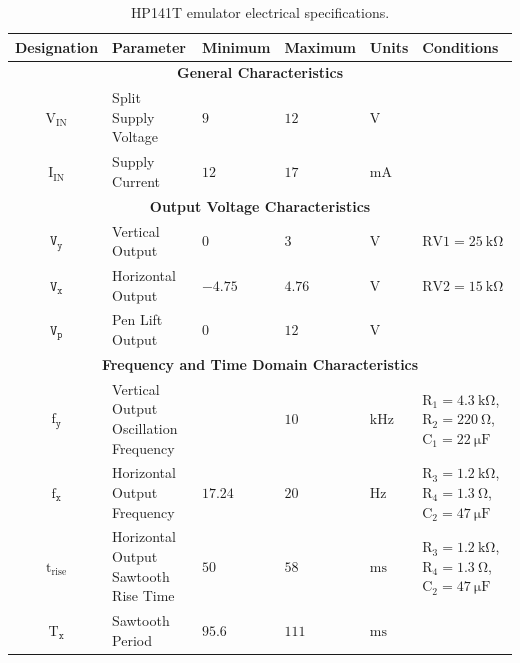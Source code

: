 \documentclass[class=report,11pt,crop=false]{standalone}
\begin{document}
	\begin{table}[ht!]
		\caption{HP141T emulator electrical specifications.}
		\label{tab:vertical-output-emulator-ct-specifications}
		\centering
		\begin{tabular}{|cm{10em}m{5em}m{5em}m{5em}m{8em}|}
			\hline
			\cellcolor{cyan!25}\textbf{Designation} & \cellcolor{cyan!25}\textbf{Parameter} &	\cellcolor{cyan!25}\textbf{Minimum} &  \cellcolor{cyan!25}\textbf{Maximum}	& \cellcolor{cyan!25}\textbf{Units} & \cellcolor{cyan!25}\textbf{Conditions}\\
			\hline
			\multicolumn{6}{c}{\textbf{General Characteristics}}\\
			\hline
			$\text{V}_{\text{IN}}$ & Split Supply Voltage  & $9$ & $12$ & $\si{\volt}$ & \\
			\hline
			$\text{I}_{\text{IN}}$ & Supply Current  & $12$ & $17$ & $\si{\milli\ampere}$ & \\
			\hline
			\multicolumn{6}{c}{\textbf{Output Voltage Characteristics}}\\
			\hline
			$\texttt{V}_\texttt{y}$	& Vertical Output	&	$0$	&	$3$ & $\si{\volt}$ & $\text{RV1} = \SI{25}{\kilo\ohm}$ \\
			\hline
			$\texttt{V}_\texttt{x}$	& Horizontal Output	&	$-4.75$	&	$4.76$ & $\si{\volt}$ & $\text{RV2} = \SI{15}{\kilo\ohm}$\\
			\hline
			$\texttt{V}_\texttt{p}$	& Pen Lift Output	&   $0$	& 	$12$ & $\si{\volt}$ & \\
			\hline
			\multicolumn{6}{c}{\textbf{Frequency and Time Domain Characteristics}}\\
			\hline
			$\text{f}_\texttt{y}$	& Vertical Output Oscillation Frequency	&	&	$10$ & $\si{\kilo\hertz}$ & $\text{R}_1 = \SI{4.3}{\kilo\ohm}$, $\text{R}_2 = \SI{220}{\ohm}$, $\text{C}_1 = \SI{22}{\micro\farad}$ \\
			\hline
			$\text{f}_\texttt{x}$	& Horizontal Output Frequency	& $17.24$ 	& $20$ & $\si{\hertz}$ & $\text{R}_3 = \SI{1.2}{\kilo\ohm}$, $\text{R}_4 = \SI{1.3}{\ohm}$, $\text{C}_2 = \SI{47}{\micro\farad}$\\
			\hline
			$\text{t}_\text{rise}$				& Horizontal Output Sawtooth Rise Time	& $50$	&	$58$ &	$\si{\milli\second}$	&	$\text{R}_3 = \SI{1.2}{\kilo\ohm}$, $\text{R}_4 = \SI{1.3}{\ohm}$, $\text{C}_2 = \SI{47}{\micro\farad}$\\
			\hline
			$\text{T}_\texttt{x}$	&	Sawtooth Period	& $95.6$	& $111$	& $\si{\milli\second}$	& \\
			\hline
		\end{tabular}
	\end{table}
\end{document}
